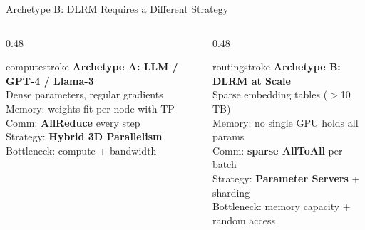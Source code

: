 \documentclass[aspectratio=169, 12pt]{beamer}
\begin{document}
\begin{frame}{Archetype B: DLRM Requires a Different Strategy}
\small
\begin{columns}[T]
  \begin{column}{0.48\textwidth}
    \begin{mlsyscard}{computestroke}
    \textbf{Archetype A: LLM / GPT-4 / Llama-3}\\[0.05cm]
    {\footnotesize
    Dense parameters, regular gradients\\
    Memory: weights fit per-node with TP\\
    Comm: \textbf{AllReduce} every step\\
    Strategy: \textbf{Hybrid 3D Parallelism}\\
    Bottleneck: compute + bandwidth
    }
    \end{mlsyscard}
  \end{column}
  \begin{column}{0.48\textwidth}
    \begin{mlsyscard}{routingstroke}
    \textbf{Archetype B: DLRM at Scale}\\[0.05cm]
    {\footnotesize
    Sparse embedding tables ($>$10 TB)\\
    Memory: no single GPU holds all params\\
    Comm: \textbf{sparse AllToAll} per batch\\
    Strategy: \textbf{Parameter Servers} + sharding\\
    Bottleneck: memory capacity + random access
    }
    \end{mlsyscard}
  \end{column}
\end{columns}

\vspace{0.15cm}

\end{frame}
\end{document}
